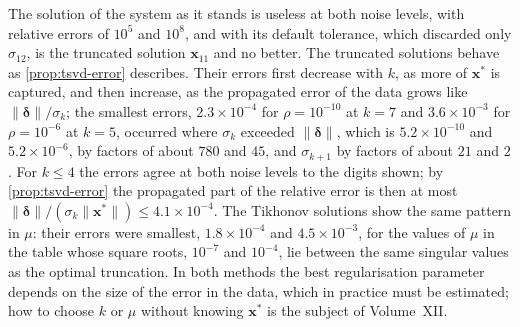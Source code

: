 \begin{table}
\end{table}

The solution of the system as it stands is useless at both noise levels, with relative errors of $10^5$ and $10^8$, and  with its default tolerance, which discarded only $\sigma_{12}$, is the truncated solution $\mathbf x_{11}$ and no better. The truncated solutions behave as \cref{prop:tsvd-error} describes. Their errors first decrease with $k$, as more of $\mathbf x^*$ is captured, and then increase, as the propagated error of the data grows like $\|\boldsymbol\delta\|/\sigma_k$; the smallest errors, $2.3\times10^{-4}$ for $\rho=10^{-10}$ at $k=7$ and $3.6\times10^{-3}$ for $\rho=10^{-6}$ at $k=5$, occurred where $\sigma_k$ exceeded $\|\boldsymbol\delta\|$, which is $5.2\times10^{-10}$ and $5.2\times10^{-6}$, by factors of about $780$ and $45$, and $\sigma_{k+1}$ by factors of about $21$ and $2$. For $k\le4$ the errors agree at both noise levels to the digits shown; by \cref{prop:tsvd-error} the propagated part of the relative error is then at most $\|\boldsymbol\delta\|/(\sigma_k\|\mathbf x^*\|)\le4.1\times10^{-4}$. The Tikhonov solutions show the same pattern in $\mu$: their errors were smallest, $1.8\times10^{-4}$ and $4.5\times10^{-3}$, for the values of $\mu$ in the table whose square roots, $10^{-7}$ and $10^{-4}$, lie between the same singular values as the optimal truncation. In both methods the best regularisation parameter depends on the size of the error in the data, which in practice must be estimated; how to choose $k$ or $\mu$ without knowing $\mathbf x^*$ is the subject of Volume~XII.

